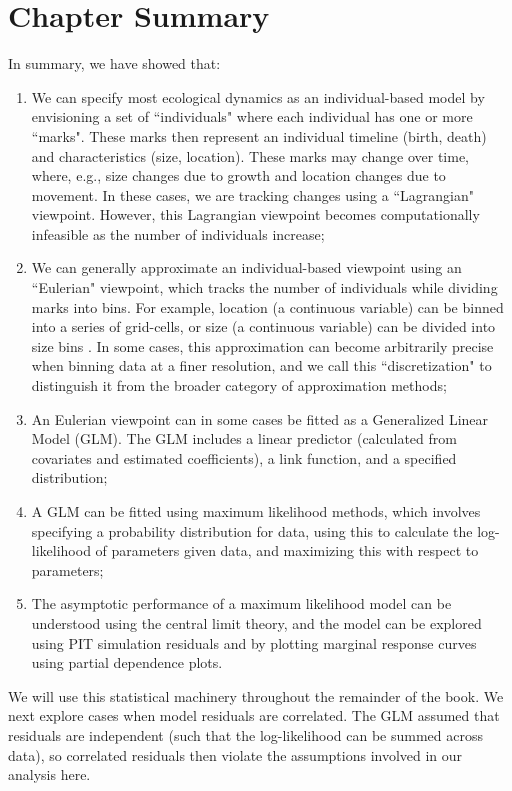 \section{Chapter Summary}

In summary, we have showed that:
\begin{enumerate}
    \item We can specify most ecological dynamics as an individual-based model by envisioning a set of ``individuals" where each individual has one or more ``marks".  These marks then represent an individual timeline (birth, death) and characteristics (size, location).  These marks may change over time, where, e.g., size changes due to growth and location changes due to movement.  In these cases, we are tracking changes using a ``Lagrangian" viewpoint.  However, this Lagrangian viewpoint becomes computationally infeasible as the number of individuals increase;

    \item We can generally approximate an individual-based viewpoint using an ``Eulerian" viewpoint, which tracks the number of individuals while dividing marks into bins.  For example, location (a continuous variable) can be binned into a series of grid-cells, or size (a continuous variable) can be divided into size bins \cite{merow_using_2014}.  In some cases, this approximation can become arbitrarily precise when binning data at a finer resolution, and we call this ``discretization" to distinguish it from the broader category of approximation methods;  

    \item An Eulerian viewpoint can in some cases be fitted as a Generalized Linear Model (GLM).  The GLM includes a linear predictor (calculated from covariates and estimated coefficients), a link function, and a specified distribution;

    \item A GLM can be fitted using maximum likelihood methods, which involves specifying a probability distribution for data, using this to calculate the log-likelihood of parameters given data, and maximizing this with respect to parameters; 

    \item The asymptotic performance of a maximum likelihood model can be understood using the central limit theory, and the model can be explored using PIT simulation residuals and by plotting marginal response curves using partial dependence plots. 
\end{enumerate}
We will use this statistical machinery throughout the remainder of the book.  We next explore cases when model residuals are correlated. The GLM assumed that residuals are independent (such that the log-likelihood can be summed across data), so correlated residuals then violate the assumptions involved in our analysis here. 

